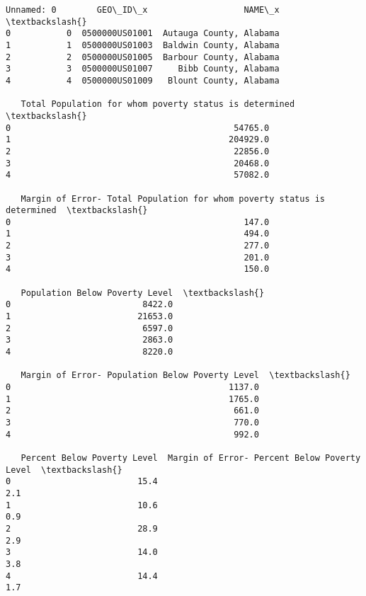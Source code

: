 \documentclass[11pt]{article}
\makeatletter
\newcommand{\boxspacing}{\kern\kvtcb@left@rule\kern\kvtcb@boxsep}
\newcommand{\prompt}[4]{
        \ttfamily\llap{{\color{#2}[#3]:\hspace{3pt}#4}}\vspace{-\baselineskip}
    }
\makeatother
\begin{document}
            \begin{tcolorbox}[breakable, size=fbox, boxrule=.5pt, pad at break*=1mm, opacityfill=0]
\prompt{Out}{outcolor}{49}{\boxspacing}
\begin{Verbatim}[commandchars=\\\{\}]
   Unnamed: 0        GEO\_ID\_x                   NAME\_x  \textbackslash{}
0           0  0500000US01001  Autauga County, Alabama
1           1  0500000US01003  Baldwin County, Alabama
2           2  0500000US01005  Barbour County, Alabama
3           3  0500000US01007     Bibb County, Alabama
4           4  0500000US01009   Blount County, Alabama

   Total Population for whom poverty status is determined  \textbackslash{}
0                                            54765.0
1                                           204929.0
2                                            22856.0
3                                            20468.0
4                                            57082.0

   Margin of Error- Total Population for whom poverty status is determined  \textbackslash{}
0                                              147.0
1                                              494.0
2                                              277.0
3                                              201.0
4                                              150.0

   Population Below Poverty Level  \textbackslash{}
0                          8422.0
1                         21653.0
2                          6597.0
3                          2863.0
4                          8220.0

   Margin of Error- Population Below Poverty Level  \textbackslash{}
0                                           1137.0
1                                           1765.0
2                                            661.0
3                                            770.0
4                                            992.0

   Percent Below Poverty Level  Margin of Error- Percent Below Poverty Level  \textbackslash{}
0                         15.4                                           2.1
1                         10.6                                           0.9
2                         28.9                                           2.9
3                         14.0                                           3.8
4                         14.4                                           1.7


\end{Verbatim}
\end{tcolorbox}
\end{document}
